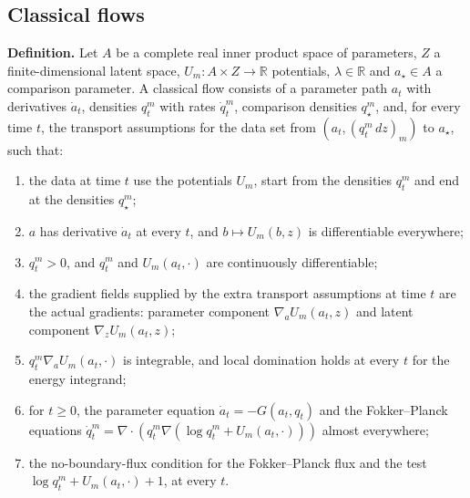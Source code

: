 \documentclass[11pt,a4paper]{report}
\begin{document}
\subsection{\texorpdfstring{Classical flows}{Classical flows}}




\textbf{Definition.} Let \(A\) be a complete real inner product space of parameters, \(Z\) a finite-dimensional latent space, \(U_m:A\times Z\to\mathbb R\) potentials, \(\lambda\in\mathbb R\) and \(a_\star\in A\) a comparison parameter. A classical flow consists of a parameter path \(a_t\) with derivatives \(\dot a_t\), densities \(q_t^m\) with rates \(\dot q_t^m\), comparison densities \(q_\star^m\), and, for every time \(t\), the transport assumptions for the data set from \((a_t,(q_t^m\,dz)_m)\) to \(a_\star\), such that:



\begin{enumerate}


\item the data at time \(t\) use the potentials \(U_m\), start from the densities \(q_t^m\) and end at the densities \(q_\star^m\);

\item \(a\) has derivative \(\dot a_t\) at every \(t\), and \(b\mapsto U_m(b,z)\) is differentiable everywhere;

\item \(q_t^m>0\), and \(q_t^m\) and \(U_m(a_t,\cdot)\) are continuously differentiable;

\item the gradient fields supplied by the extra transport assumptions at time \(t\) are the actual gradients: parameter component \(\nabla_aU_m(a_t,z)\) and latent component \(\nabla_zU_m(a_t,z)\);

\item \(q_t^m\nabla_aU_m(a_t,\cdot)\) is integrable, and local domination holds at every \(t\) for the energy integrand;

\item for \(t\ge0\), the parameter equation \(\dot a_t=-G(a_t,q_t)\) and the Fokker–Planck equations \(\dot q_t^m=\nabla\cdot(q_t^m\nabla(\log q_t^m+U_m(a_t,\cdot)))\) almost everywhere;

\item the no-boundary-flux condition for the Fokker–Planck flux and the test \(\log q_t^m+U_m(a_t,\cdot)+1\), at every \(t\).

\end{enumerate}
\end{document}
